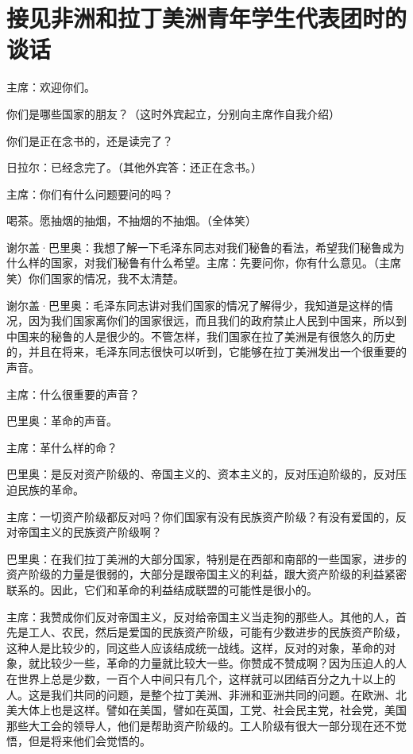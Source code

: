 \section[接见非洲和拉丁美洲青年学生代表团时的谈话（一九六四年八月二十五日）]{接见非洲和拉丁美洲青年学生代表团时的谈话}


主席：欢迎你们。

你们是哪些国家的朋友？（这时外宾起立，分别向主席作自我介绍）

你们是正在念书的，还是读完了？

日拉尔：已经念完了。（其他外宾答：还正在念书。）

主席：你们有什么问题要问的吗？

喝茶。愿抽烟的抽烟，不抽烟的不抽烟。（全体笑）

谢尔盖·巴里奥：我想了解一下毛泽东同志对我们秘鲁的看法，希望我们秘鲁成为什么样的国家，对我们秘鲁有什么希望。主席：先要问你，你有什么意见。（主席笑）你们国家的情况，我不太清楚。

谢尔盖·巴里奥：毛泽东同志讲对我们国家的情况了解得少，我知道是这样的情况，因为我们国家离你们的国家很远，而且我们的政府禁止人民到中国来，所以到中国来的秘鲁的人是很少的。不管怎样，我们国家在拉了美洲是有很悠久的历史的，并且在将来，毛泽东同志很快可以听到，它能够在拉丁美洲发出一个很重要的声音。

主席：什么很重要的声音？

巴里奥：革命的声音。

主席：革什么样的命？

巴里奥：是反对资产阶级的、帝国主义的、资本主义的，反对压迫阶级的，反对压迫民族的革命。

主席：一切资产阶级都反对吗？你们国家有没有民族资产阶级？有没有爱国的，反对帝国主义的民族资产阶级啊？

巴里奥：在我们拉丁美洲的大部分国家，特别是在西部和南部的一些国家，进步的资产阶级的力量是很弱的，大部分是跟帝国主义的利益，跟大资产阶级的利益紧密联系的。因此，它们和革命的利益结成联盟的可能性是很小的。

主席：我赞成你们反对帝国主义，反对给帝国主义当走狗的那些人。其他的人，首先是工人、农民，然后是爱国的民族资产阶级，可能有少数进步的民族资产阶级，这种人是比较少的，同这些人应该结成统一战线。这样，反对的对象，革命的对象，就比较少一些，革命的力量就比较大一些。你赞成不赞成啊？因为压迫人的人在世界上总是少数，一百个人中间只有几个，这样就可以团结百分之九十以上的人。这是我们共同的问题，是整个拉丁美洲、非洲和亚洲共同的问题。在欧洲、北美大体上也是这样。譬如在美国，譬如在英国，工党、社会民主党，社会党，美国那些大工会的领导人，他们是帮助资产阶级的。工人阶级有很大一部分现在还不觉悟，但是将来他们会觉悟的。

